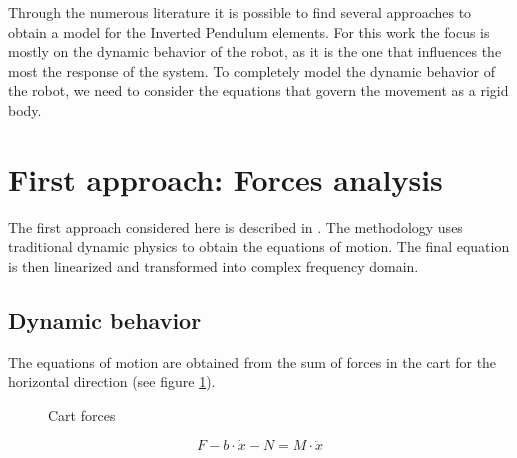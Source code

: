 
Through the numerous literature it is possible to find several approaches to obtain a model for the Inverted Pendulum elements. For this work the focus is mostly on the dynamic behavior of the robot, as it is the one that influences the most the response of the system. To completely model the dynamic behavior of the robot, we need to consider the equations that govern the movement as a rigid body.

\section{First approach: Forces analysis}

The first approach considered here is described in \cite{SUL03}. The methodology uses traditional dynamic physics to obtain the equations of motion. The final equation is then linearized and transformed into complex frequency domain.

\subsection{Dynamic behavior}

The equations of motion are obtained from the sum of forces in the cart for the horizontal direction (see figure \ref{fig:carforces}).

\begin{figure}[h]
	\centering
	\caption{Cart forces}\label{fig:carforces}
\end{figure}

\begin{equation} \label{sfch}
	F-b\cdot \dot{x}-N=M\cdot \ddot{x}
\end{equation}

